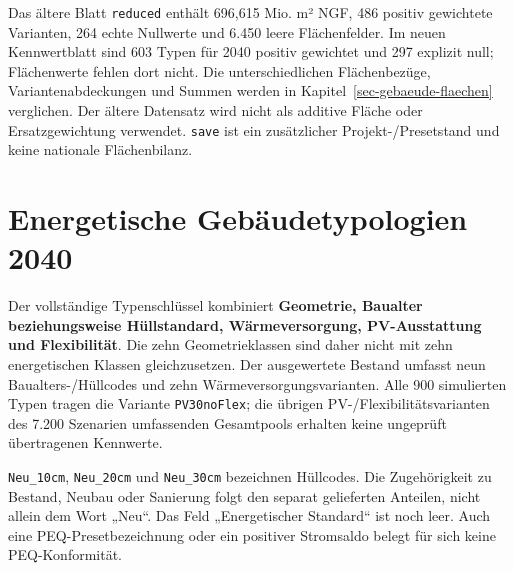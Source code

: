 \documentclass[
  ngerman,
  a4paper,
  DIV=11]{scrreprt}
\begin{document}
Das ältere Blatt \texttt{reduced} enthält 696,615 Mio. m² NGF, 486
positiv gewichtete Varianten, 264 echte Nullwerte und 6.450 leere
Flächenfelder. Im neuen Kennwertblatt sind 603 Typen für 2040 positiv
gewichtet und 297 explizit null; Flächenwerte fehlen dort nicht. Die
unterschiedlichen Flächenbezüge, Variantenabdeckungen und Summen werden
in Kapitel~\ref{sec-gebaeude-flaechen} verglichen. Der ältere Datensatz
wird nicht als additive Fläche oder Ersatzgewichtung verwendet.
\texttt{save} ist ein zusätzlicher Projekt-/Presetstand und keine
nationale Flächenbilanz.

\section{Energetische Gebäudetypologien
2040}\label{sec-gebaeudetypologien}

Der vollständige Typenschlüssel kombiniert \textbf{Geometrie, Baualter
beziehungsweise Hüllstandard, Wärmeversorgung, PV-Ausstattung und
Flexibilität}. Die zehn Geometrieklassen sind daher nicht mit zehn
energetischen Klassen gleichzusetzen. Der ausgewertete Bestand umfasst
neun Baualters-/Hüllcodes und zehn Wärmeversorgungsvarianten. Alle 900
simulierten Typen tragen die Variante \texttt{PV30\textbar{}noFlex}; die
übrigen PV-/Flexibilitätsvarianten des 7.200 Szenarien umfassenden
Gesamtpools erhalten keine ungeprüft übertragenen Kennwerte.

\texttt{Neu\_10cm}, \texttt{Neu\_20cm} und \texttt{Neu\_30cm} bezeichnen
Hüllcodes. Die Zugehörigkeit zu Bestand, Neubau oder Sanierung folgt den
separat gelieferten Anteilen, nicht allein dem Wort „Neu``. Das Feld
„Energetischer Standard`` ist noch leer. Auch eine PEQ-Presetbezeichnung
oder ein positiver Stromsaldo belegt für sich keine PEQ-Konformität.
\end{document}
